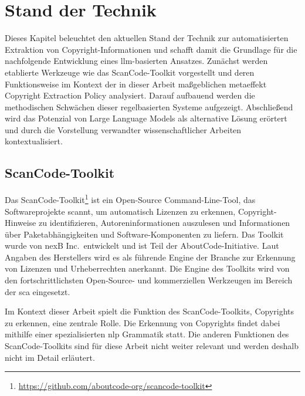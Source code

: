 \chapter{Stand der Technik}\label{ch:stand-der-technik}

Dieses Kapitel beleuchtet den aktuellen Stand der Technik zur automatisierten Extraktion von Copyright-Informationen und schafft damit die Grundlage für die nachfolgende Entwicklung eines \gls{llm}-basierten Ansatzes.
Zunächst werden etablierte Werkzeuge wie das ScanCode-Toolkit vorgestellt und deren Funktionsweise im Kontext der in dieser Arbeit maßgeblichen metaeffekt Copyright Extraction Policy analysiert.
Darauf aufbauend werden die methodischen Schwächen dieser regelbasierten Systeme aufgezeigt.
Abschließend wird das Potenzial von Large Language Models als alternative Lösung erörtert und durch die Vorstellung verwandter wissenschaftlicher Arbeiten kontextualisiert.


\section{ScanCode-Toolkit}\label{sec:scancode-toolkit}

Das ScanCode-Toolkit\footnote{\url{https://github.com/aboutcode-org/scancode-toolkit}} ist ein Open-Source Command-Line-Tool, das Softwareprojekte scannt, um automatisch Lizenzen zu erkennen, Copyright-Hinweise zu identifizieren, Autoreninformationen auszulesen und Informationen über Paketabhängigkeiten und Software-Komponenten zu liefern.
Das Toolkit wurde von nexB Inc.\ entwickelt und ist Teil der AboutCode-Initiative.
Laut Angaben des Herstellers wird es als führende Engine der Branche zur Erkennung von Lizenzen und Urheberrechten anerkannt.
Die Engine des Toolkits wird von den fortschrittlichsten Open-Source- und kommerziellen Werkzeugen im Bereich der \gls{sca} eingesetzt.

Im Kontext dieser Arbeit spielt die Funktion des ScanCode-Toolkits, Copyrights zu erkennen, eine zentrale Rolle.
Die Erkennung von Copyrights findet dabei mithilfe einer spezialisierten \gls{nlp} Grammatik statt.
Die anderen Funktionen des ScanCode-Toolkits sind für diese Arbeit nicht weiter relevant und werden deshalb nicht im Detail erläutert\autocite{noauthor_scancode-toolkit-documentation_nodate}.


